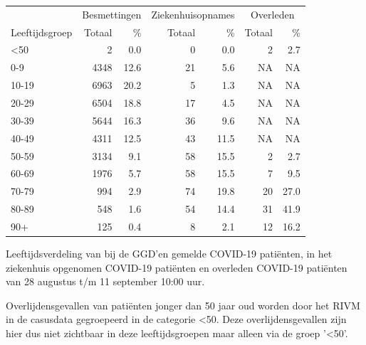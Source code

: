\documentclass[
  english,
  man,floatsintext]{apa6}
\begin{document}
\begin{table}
\centering\begingroup\fontsize{11}{13}\selectfont

\begin{threeparttable}
\begin{tabular}{lrrrrrr}
\toprule
\multicolumn{1}{c}{ } & \multicolumn{2}{c}{Besmettingen} & \multicolumn{2}{c}{Ziekenhuisopnames} & \multicolumn{2}{c}{Overleden} \\
\cmidrule(l{3pt}r{3pt}){2-3} \cmidrule(l{3pt}r{3pt}){4-5} \cmidrule(l{3pt}r{3pt}){6-7}
Leeftijdsgroep & Totaal & \% & Totaal & \% & Totaal & \%\\
\midrule
<50 & 2 & 0.0 & 0 & 0.0 & 2 & 2.7\\
0-9 & 4348 & 12.6 & 21 & 5.6 & NA & NA\\
10-19 & 6963 & 20.2 & 5 & 1.3 & NA & NA\\
20-29 & 6504 & 18.8 & 17 & 4.5 & NA & NA\\
30-39 & 5644 & 16.3 & 36 & 9.6 & NA & NA\\
40-49 & 4311 & 12.5 & 43 & 11.5 & NA & NA\\
50-59 & 3134 & 9.1 & 58 & 15.5 & 2 & 2.7\\
60-69 & 1976 & 5.7 & 58 & 15.5 & 7 & 9.5\\
70-79 & 994 & 2.9 & 74 & 19.8 & 20 & 27.0\\
80-89 & 548 & 1.6 & 54 & 14.4 & 31 & 41.9\\
90+ & 125 & 0.4 & 8 & 2.1 & 12 & 16.2\\
\bottomrule
\end{tabular}
\begin{tablenotes}
\item[1] Leeftijdsverdeling van bij de GGD’en gemelde COVID-19 patiënten, in het ziekenhuis opgenomen COVID-19 patiënten en overleden COVID-19 patiënten van 28 augustus t/m 11 september 10:00 uur.
\item[2] Overlijdensgevallen van patiënten jonger dan 50 jaar oud worden door het RIVM in de casusdata gegroepeerd in de categorie <50. Deze overlijdensgevallen zijn hier dus niet zichtbaar in deze leeftijdsgroepen maar alleen via de groep '<50'.
\end{tablenotes}
\end{threeparttable}
\endgroup{}
\end{table}

\newpage
\end{document}
